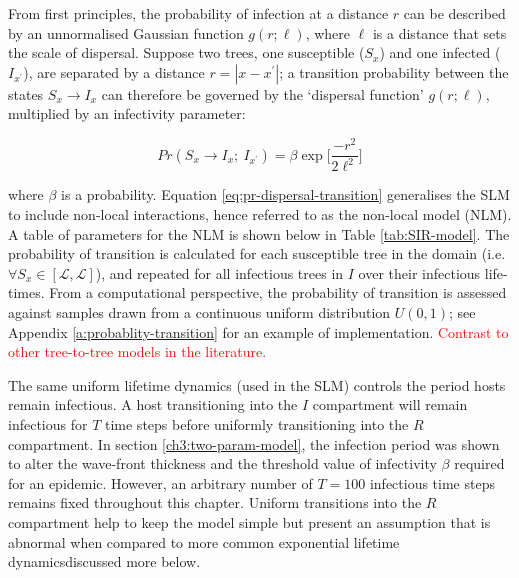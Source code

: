 From first principles, the probability of infection at a distance $r$ can be described by an unnormalised Gaussian function $g(r; \ell)$,
where $\ell$ is a distance that sets the scale of dispersal. 
Suppose two trees, one susceptible ($S_x$) and one infected ($I_{x^\prime}$), are separated by a distance $r=|x - x^\prime|$;
a transition probability between the states $S_x \rightarrow I_x$ can therefore be governed by the `dispersal function' $g(r; \ell)$, multiplied by an infectivity parameter:

\begin{equation}
\label{eq:pr-dispersal-transition}
    Pr(S_{x} \rightarrow I_{x} ;\ I_{x^{\prime}} ) = \beta \exp\Big[\frac{-r^2}{2\ell^2}\Big]
\end{equation}

where $\beta$ is a probability. 
Equation \ref{eq:pr-dispersal-transition} generalises the SLM to include non-local interactions, hence referred to as the non-local model (NLM).
A table of parameters for the NLM is shown below in Table \ref{tab:SIR-model}.
The probability of transition is calculated for each susceptible tree in the domain (i.e. $\forall S_x \in [\mathcal{L}, \mathcal{L}]$),
and repeated for all infectious trees in $I$ over their infectious life-times.
From a computational perspective, the probability of transition is assessed against samples drawn from a continuous uniform distribution $U(0, 1)$;
see Appendix \ref{a:probablity-transition} for an example of implementation.
\textcolor{red}{Contrast to other tree-to-tree models in the literature.}

The same uniform lifetime dynamics (used in the SLM) controls the period hosts remain infectious.
A host transitioning into the $I$ compartment will remain infectious for $T$ time steps before uniformly transitioning into the $R$ compartment.
In section \ref{ch3:two-param-model}, the infection period was shown to alter the wave-front thickness and the threshold value of infectivity $\beta$ required for an epidemic. 
However, an arbitrary number of $T=100$ infectious time steps remains fixed throughout this chapter.
Uniform transitions into the $R$ compartment help to keep the model simple but present an assumption that is abnormal when compared to more common exponential lifetime dynamics\textemdash discussed more below.

